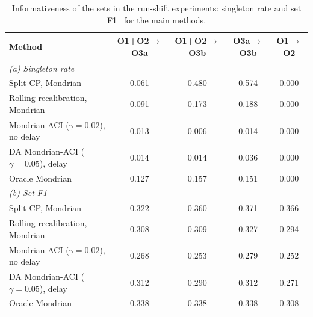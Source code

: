 \begin{table}[!htbp]
\caption{Informativeness of the sets in the run-shift experiments: singleton rate and set F1~\cite{malz2025} for the main methods.}\label{tab:e2info}
\centering\footnotesize\setlength{\tabcolsep}{4pt}
\begin{tabular}{lcccc}\toprule
Method & O1+O2$\rightarrow$O3a & O1+O2$\rightarrow$O3b & O3a$\rightarrow$O3b & O1$\rightarrow$O2\\\midrule
\multicolumn{5}{l}{\emph{(a) Singleton rate}}\\
Split CP, Mondrian & 0.061 & 0.480 & 0.574 & 0.000\\
Rolling recalibration, Mondrian & 0.091 & 0.173 & 0.188 & 0.000\\
Mondrian-ACI ($\gamma=0.02$), no delay & 0.013 & 0.006 & 0.014 & 0.000\\
DA Mondrian-ACI ($\gamma=0.05$), delay & 0.014 & 0.014 & 0.036 & 0.000\\
Oracle Mondrian & 0.127 & 0.157 & 0.151 & 0.000\\
\midrule
\multicolumn{5}{l}{\emph{(b) Set F1}}\\
Split CP, Mondrian & 0.322 & 0.360 & 0.371 & 0.366\\
Rolling recalibration, Mondrian & 0.308 & 0.309 & 0.327 & 0.294\\
Mondrian-ACI ($\gamma=0.02$), no delay & 0.268 & 0.253 & 0.279 & 0.252\\
DA Mondrian-ACI ($\gamma=0.05$), delay & 0.312 & 0.290 & 0.312 & 0.271\\
Oracle Mondrian & 0.338 & 0.338 & 0.338 & 0.308\\
\bottomrule
\end{tabular}
\end{table}
